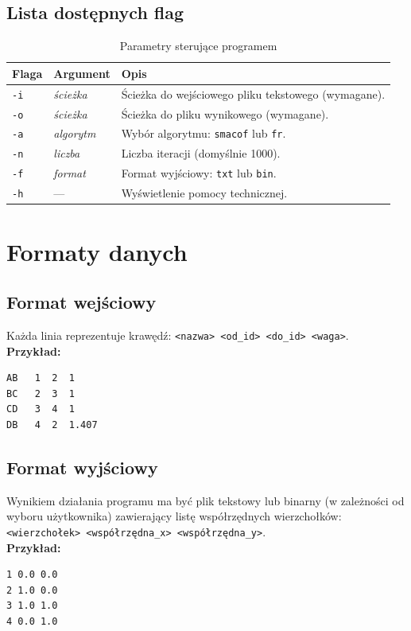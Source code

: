 \documentclass[12pt,a4paper]{article}
\begin{document}
\subsection{Lista dostępnych flag}
\begin{table}[H]
\centering
\begin{tabular}{@{}lll@{}}
\toprule
\textbf{Flaga} & \textbf{Argument} & \textbf{Opis} \\ \midrule
\texttt{-i} & \textit{ścieżka} & Ścieżka do wejściowego pliku tekstowego (wymagane). \\
\texttt{-o} & \textit{ścieżka} & Ścieżka do pliku wynikowego (wymagane). \\
\texttt{-a} & \textit{algorytm} & Wybór algorytmu: \texttt{smacof} lub \texttt{fr}. \\
\texttt{-n} & \textit{liczba} & Liczba iteracji (domyślnie 1000). \\
\texttt{-f} & \textit{format} & Format wyjściowy: \texttt{txt} lub \texttt{bin}. \\
\texttt{-h} & --- & Wyświetlenie pomocy technicznej. \\
\bottomrule
\end{tabular}
\caption{Parametry sterujące programem}
\end{table}

\section{Formaty danych}
\subsection{Format wejściowy}
Każda linia reprezentuje krawędź: \texttt{<nazwa> <od\_id> <do\_id> <waga>}.
\\
\textbf{Przykład:}
\begin{lstlisting}
AB   1  2  1
BC   2  3  1
CD   3  4  1
DB   4  2  1.407
\end{lstlisting}

\subsection{Format wyjściowy}
Wynikiem działania programu ma być plik tekstowy lub binarny (w zależności od wyboru użytkownika) zawierający listę współrzędnych wierzchołków: \texttt{<wierzchołek> <współrzędna\_x> <współrzędna\_y>}.
\\
\textbf{Przykład:}
\begin{lstlisting}
1 0.0 0.0
2 1.0 0.0
3 1.0 1.0
4 0.0 1.0
\end{lstlisting}
\end{document}
